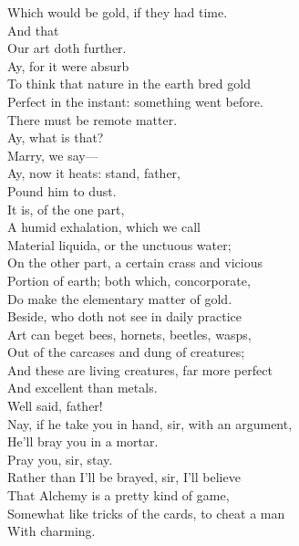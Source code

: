 \documentclass[a4paper,oneside,12pt]{memoir}
\begin{document}
\begin{drama*}
Which would be gold, if they had time.\\
\mammonspeaks {} And that\\
Our art doth further.\\
\subtlespeaks {} Ay, for it were absurb\\
To think that nature in the earth bred gold\\
Perfect in the instant: something went before.\\
There must be remote matter.\\
\surlyspeaks {} Ay, what is that?\\
\subtlespeaks Marry, we say---\\
\mammonspeaks {} Ay, now it heats: stand, father,\\
Pound him to dust.\\
\subtlespeaks {} It is, of the one part,\\
A humid exhalation, which we call\\
Material liquida, or the unctuous water;\\
On the other part, a certain crass and vicious\\
Portion of earth; both which, concorporate,\\
Do make the elementary matter of gold.\\
Beside, who doth not see in daily practice\\
Art can beget bees, hornets, beetles, wasps,\\
Out of the carcases and dung of creatures;\\
And these are living creatures, far more perfect\\
And excellent than metals.\\
\mammonspeaks {} Well said, father!\\
Nay, if he take you in hand, sir, with an argument,\\
He'll bray you in a mortar.\\
\surlyspeaks {} Pray you, sir, stay.\\
Rather than I'll be brayed, sir, I'll believe\\
That Alchemy is a pretty kind of game,\\
Somewhat like tricks of the cards, to cheat a man\\
With charming.\\

\end{drama*}
\end{document}
